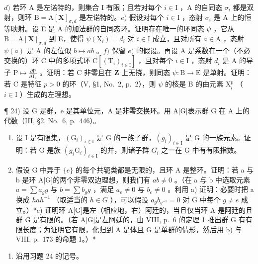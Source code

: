 \(d)\) 若环 A 是左诺特的，则集合 I 有限；且若对每个 \(i \in \mathrm{I}\) ，A 的自同态 \(\sigma_i\) 都是双射，则环 \(\mathrm{B} = \mathrm{A}[\mathbf{X}]_{\sigma,d}\) 是左诺特的。\(e)\) 假设对每个 \(i \in \mathrm{I}\) ，态射 \(\sigma_i\) 是 A 上的恒等映射。设 E 是 A 的加法群的自同态环。证明存在唯一的环同态 \(\psi\) ，它从 \(\mathrm{B} = \mathrm{A}[\mathbf{X}]_{\sigma,d}\) 到 E，使得 \(\psi(\mathrm{X}_i) = d_i\) 对 \(i \in \mathrm{I}\) 成立，且对所有 \(a \in \mathrm{A}\) ，态射 \(\psi(a)\) 是 A 的左位似 \(b \mapsto ab\) 。\(f)\) 保留 \(e)\) 的假设。再设 A 是系数在一个（不必交换的）环 C 中的多项式环 \(\mathrm{C}[(\mathrm{T}_i)_{i \in \mathrm{I}}]\) ，且对每个 \(i \in \mathrm{I}\) ，态射 \(d_i\) 是 A 的导子 \(\mathrm{P} \mapsto \frac{\partial\mathrm{P}}{\partial\mathrm{T}_i}\) 。证明：若 C 非零且在 \(\mathbf{Z}\) 上无挠，则同态 \(\psi: \mathrm{B} \to \mathrm{E}\) 是单射。证明：若 C 是特征 \(p > 0\) 的环（V, §1, No.~2, p.~2），则 \(\psi\) 的核是 B 的由元素 \(\mathrm{X}_i^p\) （ \(i \in \mathrm{I}\) ）生成的左理想。

¶ 24) 设 G 是群，e 是其单位元，A 是非零交换环。用 A{[}G{]}表示群 G 在 A 上的代数（III, §2, No.~6, p.~446）。

\begin{enumerate}
\def\labelenumi{\alph{enumi})}
\item
  设 I 是有限集，\((\mathrm{G}_{i})_{i\in\mathrm{I}}\) 是 G 的一族子群，\((g_{i})_{i\in\mathrm{I}}\) 是 G 的一族元素。证明：若 G 是族 \((g_{i}\mathrm{G}_{i})_{i\in\mathrm{I}}\) 的并，则诸子群 \(G_{i}\) 之一在 G 中有有限指数。
\item
  假设 G 中异于 \(\{e\}\) 的每个共轭类都是无限的，且环 A 是整环。证明：若 a 与 b 是环 A{[}G{]}的两个非零双边理想，则我们有 \(ab \neq 0\) 。（在 a 与 b 中选取元素 \(a = \sum a_g g\) 与 \(b = \sum b_g g\) ，满足 \(a_e \neq 0\) 与 \(b_e \neq 0\) 。利用 a) 证明：必要时把 a 换成 \(hah^{-1}\) （取适当的 \(h \in G\) ），可以假设 \(a_g b_{g^{-1}} = 0\) 对 G 中每个 \(g \neq e\) 成立。）*c) 证明环 A{[}G{]}是左（相应地，右）阿廷的，当且仅当环 A 是阿廷的且群 G 是有限的。（若 A{[}G{]}是左阿廷的，由 VIII, p.~6 的定理 1 推出群 G 有有限长度；为证明它有限，化归到 A 是体且 G 是单群的情形，然后用 b) 与 VIII, p.~173 的命题 1。）*
\end{enumerate}

\begin{enumerate}
\def\labelenumi{\arabic{enumi})}
\setcounter{enumi}{24}
\tightlist
\item
  沿用习题 24 的记号。
\end{enumerate}

